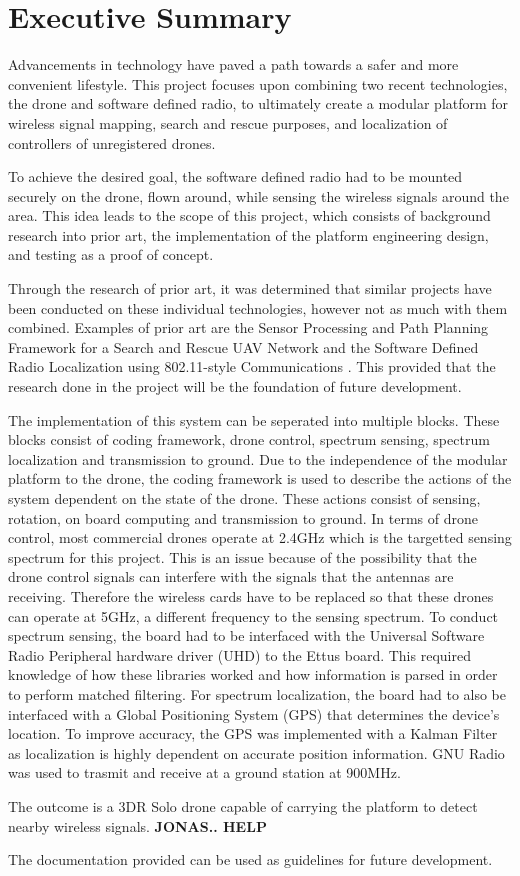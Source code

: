 \chapter*{Executive Summary}
Advancements in technology have paved a path towards a safer and more convenient lifestyle. This project focuses upon combining two recent technologies, the drone and software defined radio, to ultimately create a modular platform for wireless signal mapping, search and rescue purposes, and localization of controllers of unregistered drones. \par

To achieve the desired goal, the software defined radio had to be mounted securely on the drone, flown around, while sensing the wireless signals around the area. This idea leads to the scope of this project, which consists of background research into prior art, the implementation of the platform engineering design, and testing as a proof of concept. \par

Through the research of prior art, it was determined that similar projects have been conducted on these individual technologies, however not as much with them combined. Examples of prior art are the Sensor Processing and Path Planning Framework for a Search and Rescue UAV Network \cite{path_planning_snr_mqp} and the Software Defined Radio Localization using 802.11-style Communications \cite{sdr_localization_mqp}. This provided that the research done in the project will be the foundation of future development. \par

The implementation of this system can be seperated into multiple blocks. These blocks consist of coding framework, drone control, spectrum sensing, spectrum localization and transmission to ground. Due to the independence of the modular platform to the drone, the coding framework is used to describe the actions of the system dependent on the state of the drone. These actions consist of sensing, rotation, on board computing and transmission to ground. In terms of drone control, most commercial drones operate at 2.4GHz which is the targetted sensing spectrum for this project. This is an issue because of the possibility that the drone control signals can interfere with the signals that the antennas are receiving. Therefore the wireless cards have to be replaced so that these drones can operate at 5GHz, a different frequency to the sensing spectrum. To conduct spectrum sensing, the board had to be interfaced with the Universal Software Radio Peripheral hardware driver (UHD) to the Ettus board. This required knowledge of how these libraries worked and how information is parsed in order to perform matched filtering. For spectrum localization, the board had to also be interfaced with a Global Positioning System (GPS) that determines the device's location. To improve accuracy, the GPS was implemented with a Kalman Filter as localization is highly dependent on accurate position information. GNU Radio was used to trasmit and receive at a ground station at 900MHz. \par

The outcome is a 3DR Solo drone capable of carrying the platform to detect nearby wireless signals. \textbf{JONAS.. HELP} \par

The documentation provided can be used as guidelines for future development.